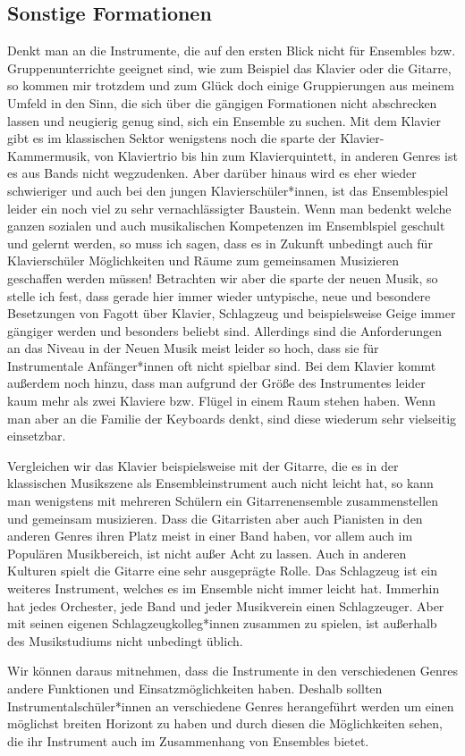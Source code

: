 \subsection{Sonstige Formationen}
Denkt man an die Instrumente, die auf den ersten Blick nicht für Ensembles bzw.
Gruppenunterrichte geeignet sind, wie zum Beispiel das Klavier oder die Gitarre,
so kommen mir trotzdem und zum Glück doch einige Gruppierungen aus meinem Umfeld
in den Sinn, die sich über die gängigen Formationen nicht abschrecken lassen und
neugierig genug sind, sich ein Ensemble zu suchen. Mit dem Klavier gibt es im
klassischen Sektor wenigstens noch die sparte der Klavier-Kammermusik, von
Klaviertrio bis hin zum Klavierquintett, in anderen Genres ist es aus Bands
nicht wegzudenken. Aber darüber hinaus wird es eher wieder schwieriger und auch
bei den jungen Klavierschüler*innen, ist das Ensemblespiel leider ein noch viel
zu sehr vernachlässigter Baustein. Wenn man bedenkt welche ganzen sozialen und
auch musikalischen Kompetenzen im Ensemblspiel geschult und gelernt werden, so
muss ich sagen, dass es in Zukunft unbedingt auch für Klavierschüler
Möglichkeiten und Räume zum gemeinsamen Musizieren geschaffen werden müssen!
Betrachten wir aber die sparte der neuen Musik, so stelle ich fest, dass gerade
hier immer wieder untypische, neue und besondere Besetzungen von Fagott über
Klavier, Schlagzeug und beispielsweise Geige immer gängiger werden und besonders
beliebt sind. Allerdings sind die Anforderungen an das Niveau in der Neuen Musik
meist leider so hoch, dass sie für Instrumentale Anfänger*innen oft nicht
spielbar sind. Bei dem Klavier kommt außerdem noch hinzu, dass man aufgrund der
Größe des Instrumentes leider kaum mehr als zwei Klaviere bzw. Flügel in einem
Raum stehen haben. Wenn man aber an die Familie der Keyboards denkt, sind diese
wiederum sehr vielseitig einsetzbar.

Vergleichen wir das Klavier beispielsweise mit der Gitarre, die es in der
klassischen Musikszene als Ensembleinstrument auch nicht leicht hat, so kann man
wenigstens mit mehreren Schülern ein Gitarrenensemble zusammenstellen und
gemeinsam musizieren. Dass die Gitarristen aber auch Pianisten in den anderen
Genres ihren Platz meist in einer Band haben, vor allem auch im Populären
Musikbereich, ist nicht außer Acht zu lassen. Auch in anderen Kulturen spielt
die Gitarre eine sehr ausgeprägte Rolle. Das Schlagzeug ist ein weiteres
Instrument, welches es im Ensemble nicht immer leicht hat. Immerhin hat jedes
Orchester, jede Band und jeder Musikverein einen Schlagzeuger. Aber mit seinen
eigenen Schlagzeugkolleg*innen zusammen zu spielen, ist außerhalb des
Musikstudiums nicht unbedingt üblich. 

Wir können daraus mitnehmen, dass die Instrumente in den verschiedenen Genres
andere Funktionen und Einsatzmöglichkeiten haben. Deshalb sollten
Instrumentalschüler*innen an verschiedene Genres herangeführt werden um einen
möglichst breiten Horizont zu haben und durch diesen die Möglichkeiten sehen,
die ihr Instrument auch im Zusammenhang von Ensembles bietet. 





